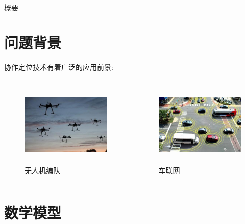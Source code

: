 \begin{frame}{概要}
  \tableofcontents
\end{frame}
\section{问题背景}%
\begin{frame}
协作定位技术有着广泛的应用前景:
  \begin{columns}[T] %
     \begin{figure}
     \includegraphics[height=4cm]{UAV.jpg}
     \caption*{无人机编队}
     \end{figure}
     \begin{figure}
     \includegraphics[height=4cm]{VL.jpg}
     \caption*{车联网}
     \end{figure}
     \end{columns}
\end{frame}
\section{数学模型}


